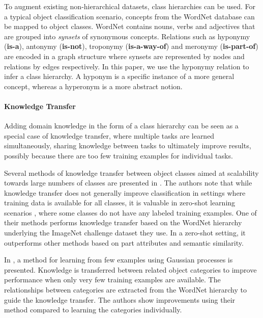 \documentclass[10pt,twocolumn,letterpaper]{article}
\begin{document}
To augment existing non-hierarchical datasets, class hierarchies can be used.
For a typical object classification scenario, concepts from the WordNet database
\cite{Fellbaum1998WordNet} can be mapped to object classes. WordNet contains
nouns, verbs and adjectives that are grouped into \emph{synsets} of synonymous concepts.
Relations such as hyponymy (\textbf{is-a}), antonymy (\textbf{is-not}), troponymy (\textbf{is-a-way-of}) and meronymy (\textbf{is-part-of}) are encoded in a graph structure
where synsets are represented by nodes and relations by edges respectively. In this paper,
we use the hyponymy relation to infer a class hierarchy. A hyponym is a specific instance
of a more general concept, whereas a hyperonym is a more abstract notion.

\paragraph{Knowledge Transfer}
Adding domain knowledge in the form of a class hierarchy
can be seen as a special case of knowledge transfer, where multiple tasks are learned
simultaneously, sharing knowledge between tasks to ultimately improve
results, possibly because there are too few training examples for individual tasks.

Several methods of knowledge transfer between object classes
aimed at scalability towards large numbers of classes are presented in \cite{Rohrbach2011Zero}.
The authors note that while knowledge transfer does not generally improve classification
in settings where training data is available for all classes, it is valuable
in zero-shot learning scenarios \cite{Palatucci2009Zero}, where some classes do not have any labeled training examples.
One of their methods performs knowledge transfer based on the WordNet hierarchy underlying
the ImageNet challenge dataset they use. In a zero-shot setting, it outperforms other
methods based on part attributes and semantic similarity.

In \cite{Rodner2010OSL}, a method for learning from few examples using Gaussian processes
is presented. Knowledge is transferred between related object categories to improve performance
when only very few training examples are available. The relationships between categories
are extracted from the WordNet hierarchy \cite{Fellbaum1998WordNet} to guide the knowledge
transfer. The authors show improvements using their method compared to learning the categories
individually.
\end{document}
